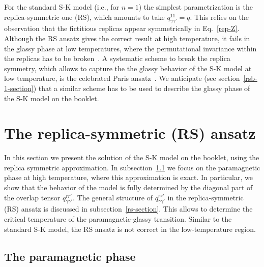 \documentclass[twocolumn,superscriptaddress,prb,10pt]{revtex4-1}
\begin{document}
For the standard S-K model (i.e., for $n=1$) the simplest parametrization is the 
replica-symmetric one (RS), which amounts to take $q^{11}_{\gamma\gamma'}=q$. 
This relies on the observation that the fictitious replicas appear symmetrically 
in Eq.~\eqref{rep-Z}. Although the RS ansatz gives the correct result at high 
temperature, it fails in the glassy phase at low temperatures, where the permutational 
invariance within the replicas has to be broken~\cite{almeida-1978}. A systematic 
scheme to break the replica symmetry, which allows to capture the the glassy behavior 
of the S-K model at low temperature, is the celebrated Paris ansatz~\cite{parisi-1979}. 
We anticipate (see section~\ref{rsb-1-section}) that a similar scheme has to be used to 
describe the glassy phase of the S-K model on the booklet. 


\section{The replica-symmetric (RS) ansatz}
\label{solution}

In this section we present the solution of the S-K model on the booklet, using 
the replica symmetric approximation. In subsection~\ref{para-section} we focus 
on the paramagnetic phase at high temperature, where this approximation is exact. 
In particular, we show that the behavior of the model is fully determined by the 
diagonal part of the overlap tensor $q_{\gamma\gamma'}^{rr'}$. The general structure 
of $q_{\gamma\gamma'}^{rr'}$ in the replica-symmetric (RS) ansatz  is discussed in 
subsection~\ref{rs-section}. This allows to determine the critical temperature of 
the paramagnetic-glassy transition. Similar to the standard S-K model, the RS ansatz 
is not correct in the low-temperature region. 

\subsection{The paramagnetic phase}
\label{para-section}
\end{document}
